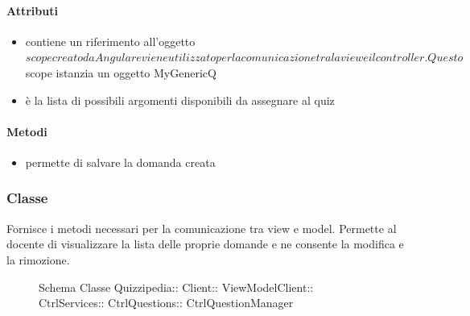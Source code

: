 \paragraph{Attributi}
\begin{itemize}
\item {}
\newline
contiene un riferimento all'oggetto $scope creato da Angular e viene utilizzato per la comunicazione tra la view e il controller. Questo $scope istanzia un oggetto MyGenericQ
\item {}
\newline
è la lista di possibili argomenti disponibili da assegnare al quiz
\end{itemize}
\paragraph{Metodi}
\begin{itemize}
\item {}
\newline
permette di salvare la domanda creata
\newline
\end{itemize}
\subsubsection{Classe }
Fornisce i metodi necessari per la comunicazione tra view e model. Permette al docente di visualizzare la lista delle proprie domande e ne consente la modifica e la rimozione.
\begin{figure}[H]
\centering
\noindent{}
\caption[Schema Classe CtrlQuestionManager]{Schema Classe Quizzipedia:: Client:: ViewModelClient:: CtrlServices:: CtrlQuestions:: CtrlQuestionManager}
\end{figure}
